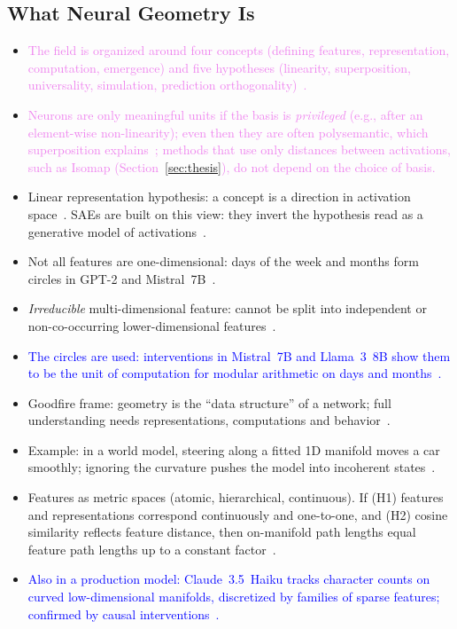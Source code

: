 \documentclass[11pt,a4paper]{article}
\newcommand{\fromextra}[1]{\textcolor{blue}{#1}}
\newcommand{\fromold}[1]{\textcolor{violet}{#1}}
\newcommand{\fromextra}[1]{#1}
\newcommand{\fromold}[1]{#1}
\begin{document}
\subsection{What Neural Geometry Is}
\begin{itemize}
  \item \fromold{The field is organized around four concepts (defining features, representation, computation, emergence) and five hypotheses (linearity, superposition, universality, simulation, prediction orthogonality)~\cite{bereska2024review}.}
  \item \fromold{Neurons are only meaningful units if the basis is \emph{privileged} (e.g., after an element-wise non-linearity); even then they are often polysemantic, which superposition explains~\cite{elhage2022toy,bereska2024review}; methods that use only distances between activations, such as Isomap (Section~\ref{sec:thesis}), do not depend on the choice of basis.}
  \item Linear representation hypothesis: a concept is a direction in activation space~\cite{park2024linear}. SAEs are built on this view: they invert the hypothesis read as a generative model of activations~\cite{bhalla2026saemanifolds}.
  \item Not all features are one-dimensional: days of the week and months form circles in GPT-2 and Mistral~7B~\cite{engels2025notall}.
  \item \emph{Irreducible} multi-dimensional feature: cannot be split into independent or non-co-occurring lower-dimensional features~\cite{engels2025notall}.
  \item \fromextra{The circles are used: interventions in Mistral~7B and Llama~3~8B show them to be the unit of computation for modular arithmetic on days and months~\cite{engels2025notall}.}
  \item Goodfire frame: geometry is the \enquote{data structure} of a network; full understanding needs representations, computations and behavior~\cite{goodfire2026world}.
  \item Example: in a world model, steering along a fitted 1D manifold moves a car smoothly; ignoring the curvature pushes the model into incoherent states~\cite{goodfire2026world}.
  \item Features as metric spaces (atomic, hierarchical, continuous). If (H1) features and representations correspond continuously and one-to-one, and (H2) cosine similarity reflects feature distance, then on-manifold path lengths equal feature path lengths up to a constant factor~\cite{modell2025origins}.
  \item \fromextra{Also in a production model: Claude~3.5~Haiku tracks character counts on curved low-dimensional manifolds, discretized by families of sparse features; confirmed by causal interventions~\cite{gurnee2025manifolds}.}
\end{itemize}
\end{document}
